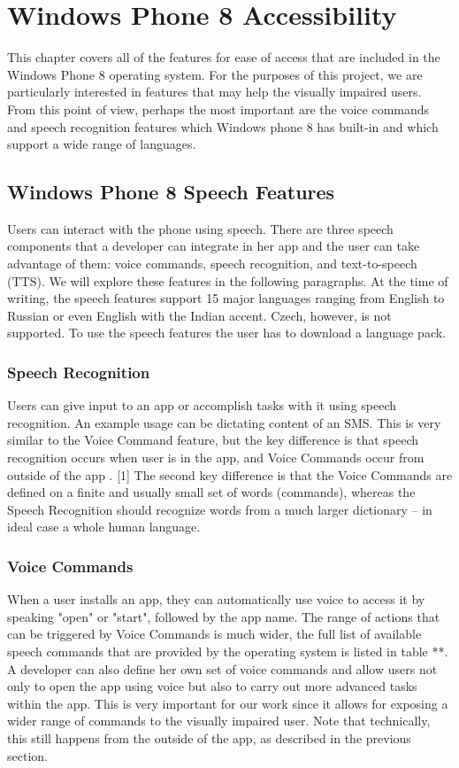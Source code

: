 \chapter{Windows Phone 8 Accessibility}
This chapter covers all of the features for ease of access that are included in the Windows Phone 8 operating system. For the purposes of this project, we are particularly interested in features that may help the visually impaired users. From this point of view, perhaps the most important are the voice commands and speech recognition features which Windows phone 8 has built-in and which support a wide range of languages.

\section{Windows Phone 8 Speech Features}
Users can interact with the phone using speech. There are three speech components that a developer can integrate in her app and the user can take advantage of them: voice commands, speech recognition, and text-to-speech (TTS). We will explore these features in the following paragraphs.
At the time of writing, the speech features support 15 major languages ranging from English to Russian or even English with the Indian accent. Czech, however, is not supported. To use the speech features the user has to download a language pack.

\subsection{Speech Recognition}
Users can give input to an app or accomplish tasks with it using speech recognition. An example usage can be dictating content of an SMS. This is very similar to the Voice Command feature, but the key difference is that speech recognition occurs when user is in the app, and Voice Commands occur from outside of the app . [1] The second key difference is that the Voice Commands are defined on a finite and usually small set of words (commands), whereas the Speech Recognition should recognize words from a much larger dictionary – in ideal case a whole human language.

\subsection{Voice Commands}
When a user installs an app, they can automatically use voice to access it by speaking "open" or "start", followed by the app name. The range of actions that can be triggered by Voice Commands is much wider, the full list of available speech commands that are provided by the operating system is listed in table **.
A developer can also define her own set of voice commands and allow users not only to open the app using voice but also to carry out more advanced tasks within the app. This is very important for our work since it allows for exposing a wider range of commands to the visually impaired user. Note that technically, this still happens from the outside of the app, as described in the previous section.

